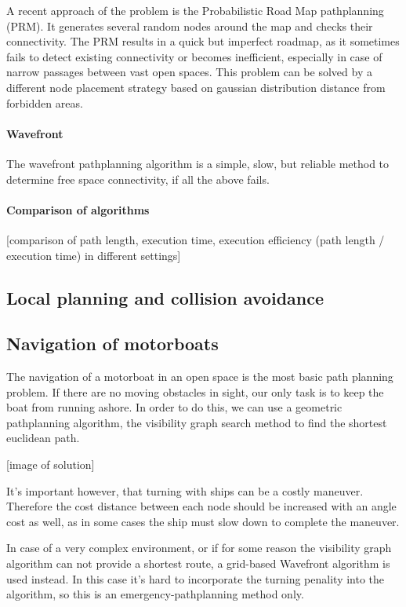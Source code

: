 A recent approach of the problem is the Probabilistic Road Map pathplanning (PRM). It generates several random nodes around the map and checks their connectivity. The PRM results in a quick but imperfect roadmap, as it sometimes fails to detect existing connectivity or becomes inefficient, especially in case of narrow passages between vast open spaces. This problem can be solved by a different node placement strategy based on gaussian distribution distance from forbidden areas.

\paragraph{Wavefront}

The wavefront pathplanning algorithm is a simple, slow, but reliable method to determine free space connectivity, if all the above fails.

\paragraph{Comparison of algorithms}

[comparison of path length, execution time, execution efficiency (path length / execution time) in different settings]

\subsection{Local planning and collision avoidance}

\subsection{Navigation of motorboats}

The navigation of a motorboat in an open space is the most basic path planning problem. If there are no moving obstacles in sight, our only task is to keep the boat from running ashore. In order to do this, we can use a geometric pathplanning algorithm, the visibility graph search method to find the shortest euclidean path.

[image of solution]

It's important however, that turning with ships can be a costly maneuver. Therefore the cost distance between each node should be increased with an angle cost as well, as in some cases the ship must slow down to complete the maneuver.

In case of a very complex environment, or if for some reason the visibility graph algorithm can not provide a shortest route, a grid-based Wavefront algorithm is used instead. In this case it's hard to incorporate the turning penality into the algorithm, so this is an emergency-pathplanning method only.

